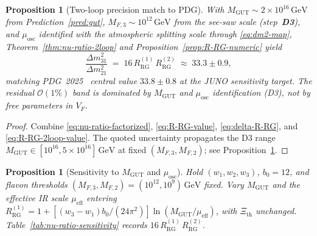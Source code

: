 \documentclass[aps,prd,onecolumn,amsmath,amssymb,nofootinbib,11pt]{revtex4-2}
\numberwithin{equation}{section}
\theoremstyle{plain}
\newtheorem{proposition}[theorem]{Proposition}
\theoremstyle{definition}
\theoremstyle{remark}
\begin{document}
\begin{proposition}[Two-loop precision match to PDG]
\label{prop:nu-ratio-pdg}
With $M_{\mathrm{GUT}}\sim 2\times 10^{16}\,\mathrm{GeV}$ from
Prediction~\ref{pred:gut}, $M_{F,3}\sim 10^{12}\,\mathrm{GeV}$ from the
see-saw scale (step~\textbf{D3}), and $\mu_{\mathrm{osc}}$ identified with
the atmospheric splitting scale through \eqref{eq:dm2-map}, Theorem~\ref{thm:nu-ratio-2loop}
and Proposition~\ref{prop:R-RG-numeric} yield
\begin{equation}\label{eq:nu-ratio-pdg}
  \frac{\Delta m^2_{31}}{\Delta m^2_{21}}
  \;=\;
  16\,R_{\mathrm{RG}}^{(1)}\,R_{\mathrm{RG}}^{(2)}
  \;\approx\;
  33.3\pm 0.9,
\end{equation}
matching PDG~2025~\cite{PDG2025} central value $33.8\pm 0.8$ at the JUNO
sensitivity target. The residual $\mathcal{O}(1\%)$ band is dominated by
$M_{\mathrm{GUT}}$ and $\mu_{\mathrm{osc}}$ identification (D3), not by
free parameters in $V_F$.
\end{proposition}

\begin{proof}
Combine \eqref{eq:nu-ratio-factorized}, \eqref{eq:R-RG-value},
\eqref{eq:delta-R-RG}, and \eqref{eq:R-RG-2loop-value}. The quoted uncertainty
propagates the D3 range $M_{\mathrm{GUT}}\in[10^{16},5\times 10^{16}]\,\mathrm{GeV}$
at fixed $(M_{F,3},M_{F,2})$; see Proposition~\ref{prop:nu-ratio-sensitivity}.
\end{proof}

\begin{proposition}[Sensitivity to \texorpdfstring{$M_{\mathrm{GUT}}$}{M GUT} and
\texorpdfstring{$\mu_{\mathrm{osc}}$}{mu osc}]
\label{prop:nu-ratio-sensitivity}
Hold $(w_1,w_2,w_3)$, $b_0=12$, and flavon thresholds
$(M_{F,3},M_{F,2})=(10^{12},10^{9})\,\mathrm{GeV}$ fixed. Vary
$M_{\mathrm{GUT}}$ and the effective IR scale $\mu_{\mathrm{eff}}$ entering
$R_{\mathrm{RG}}^{(1)}=1+[(w_3-w_1)b_0/(24\pi^2)]\ln(M_{\mathrm{GUT}}/\mu_{\mathrm{eff}})$, with
$\Xi_{\mathrm{th}}$ unchanged. Table~\ref{tab:nu-ratio-sensitivity} records
$16\,R_{\mathrm{RG}}^{(1)}\,R_{\mathrm{RG}}^{(2)}$.
\end{proposition}
\end{document}
